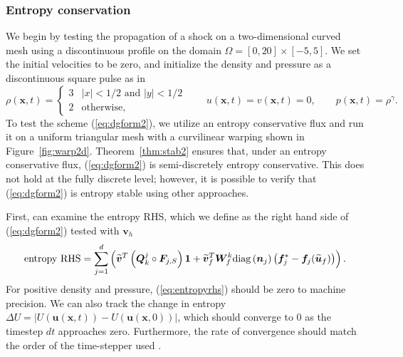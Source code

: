 \documentclass[preprint,10pt]{article}
\theoremstyle{definition}
\theoremstyle{lemma}
\theoremstyle{theorem}
\theoremstyle{assumption}
\renewcommand{\tilde}{\widetilde}
\newcommand{\LRp}[1]{\left( #1 \right)}
\newcommand{\LRb}[1]{\left| #1 \right|}
\newcommand{\diag}[1]{{\rm diag}\LRp{#1}}
\begin{document}
{\subsubsection{Entropy conservation}

We begin by testing the propagation of a shock on a two-dimensional curved mesh using a discontinuous profile on the domain $\Omega = [0,20] \times [-5,5]$.   We set the initial velocities to be zero, and initialize the density and pressure as a discontinuous square pulse as in \cite{chan2017discretely}
\begin{equation}
\rho(\bm{x},t) = \begin{cases}
3 & \LRb{x} < 1/2 \text{ and } \LRb{y} < 1/2\\
2 & \text{otherwise},
\end{cases} \qquad 
u(\bm{x},t) = v(\bm{x},t) = 0, \qquad
p(\bm{x},t) = \rho^\gamma.
\label{eq:discontin}
\end{equation}
To test the scheme (\ref{eq:dgform2}), we utilize an entropy conservative flux and run it on a uniform triangular mesh with a curvilinear warping shown in Figure~\ref{fig:warp2d}.   Theorem~\ref{thm:stab2} ensures that, under an entropy conservative flux, (\ref{eq:dgform2}) is semi-discretely entropy conservative.  This does not hold at the fully discrete level; however, it is possible to verify that (\ref{eq:dgform2}) is entropy stable using other approaches.  

First, can examine the entropy RHS, which we define as the right hand side of (\ref{eq:dgform2}) tested with $\bm{v}_h$
\begin{equation}
  \text{entropy RHS}= \sum_{j=1}^d\LRp{ \tilde{\bm{v}}^T\LRp{\bm{Q}^j_k \circ \bm{F}_{j,S}}\bm{1} + \tilde{\bm{v}}_f^T\bm{W}_f^k \diag{\bm{n}_j}\LRp{\bm{f}_j^* - \bm{f}_j(\tilde{\bm{u}}_f)}}.  
\label{eq:entropyrhs}
\end{equation}
For positive density and pressure, (\ref{eq:entropyrhs}) should be zero to machine precision.  We can also track the change in entropy $\Delta U = \LRb{U(\bm{u}(\bm{x},t))-U(\bm{u}(\bm{x},0))}$, which should converge to $0$ as the timestep $dt$ approaches zero.  Furthermore, the rate of convergence should match the order of the time-stepper used \cite{gassner2016well,chan2017discretely}.  

}
\end{document}

